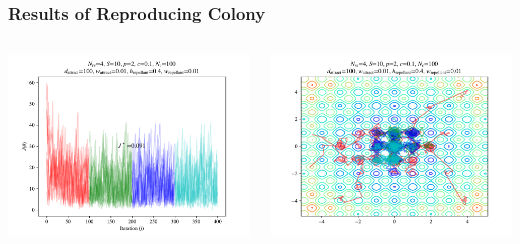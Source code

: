 \documentclass{beamer}
\begin{document}
\begin{frame}
\frametitle{Results of Reproducing Colony}
\begin{columns}[T]
    \begin{center}
      \includegraphics[scale=0.35]{assets/rastrigin_colony_re_J}
    \end{center}
  \begin{center}
    \includegraphics[scale=0.35]{assets/rastrigin_colony_re_theta}
  \end{center}
\end{columns}
\end{frame}
\end{document}

